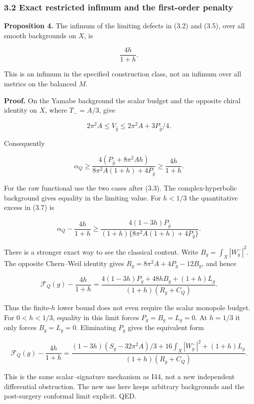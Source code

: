 \documentclass[
  10pt,
]{article}
\begin{document}
\hypertarget{exact-restricted-infimum-and-the-first-order-penalty}{%
\subsubsection{3.2 Exact restricted infimum and the first-order
penalty}\label{exact-restricted-infimum-and-the-first-order-penalty}}

\textbf{Proposition 4.} The infimum of the limiting defects in (3.2) and
(3.5), over all smooth backgrounds on \(X\), is

\[
 \boxed{\frac{4h}{1+h}.} \tag{3.6}
\]

This is an infimum in the specified construction class, not an infimum
over all metrics on the balanced \(M\).

\textbf{Proof.} On the Yamabe background the scalar budget and the
opposite chiral identity on \(X\), where \(T_-=A/3\), give

\[
 2\pi^2A\le V_{\widehat g}\le2\pi^2A+3P_{\widehat g}/4.
\]

Consequently

\[
 \alpha_Q\ge
 \frac{4(P_{\widehat g}+8\pi^2Ah)}
      {8\pi^2A(1+h)+4P_{\widehat g}}
 \ge\frac{4h}{1+h}. \tag{3.7}
\]

For the raw functional use the two cases after (3.3). The
complex-hyperbolic background gives equality in the limiting value. For
\(h<1/3\) the quantitative excess in (3.7) is

\[
 \alpha_Q-\frac{4h}{1+h}\ge
 \frac{4(1-3h)P_{\widehat g}}
 {(1+h)\{8\pi^2A(1+h)+4P_{\widehat g}\}}. \tag{3.8}
\]

There is a stronger exact way to see the classical content. Write
\(B_g=\int_X|W_g^-|^2\). The opposite Chern--Weil identity gives
\(R_g=8\pi^2A+4P_g-12B_g\), and hence

\[
 \boxed{\mathcal F_Q(g)-\frac{4h}{1+h}
 =\frac{4(1-3h)P_g+48hB_g+(1+h)L_g}
       {(1+h)(R_g+C_Q)}.} \tag{3.9a}
\]

Thus the finite-\(h\) lower bound does not even require the scalar
monopole budget. For \(0<h<1/3\), equality in this limit forces
\(P_g=B_g=L_g=0\). At \(h=1/3\) it only forces \(B_g=L_g=0\).
Eliminating \(P_g\) gives the equivalent form

\[
 \mathcal F_Q(g)-\frac{4h}{1+h}
 =\frac{(1-3h)(S_g-32\pi^2A)/3+16\int_X|W_g^-|^2+(1+h)L_g}
       {(1+h)(R_g+C_Q)}. \tag{3.9b}
\]

This is the same scalar--signature mechanism as I44, not a new
independent differential obstruction. The new use here keeps arbitrary
backgrounds and the post-surgery conformal limit explicit. QED.
\end{document}
